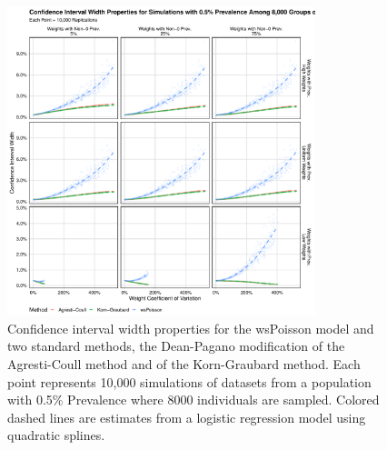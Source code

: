 \documentclass[AMA,STIX1COL]{WileyNJD-v2}
\begin{document}
\begin{figure}
\centering
\includegraphics[width=0.8\textwidth]{figures/perfect_confidence_interval_width_8000_groups_0_005_prev}
\caption{Confidence interval width properties for the wsPoisson model and two standard methods, the Dean-Pagano modification of the Agresti-Coull method and of the Korn-Graubard method.
Each point represents 10,000 simulations of datasets from a population with 0.5\% Prevalence where 8000 individuals are sampled.
Colored dashed lines are estimates from a logistic regression model using quadratic splines.}
\label{fig:perfect_confidence_interval_width_8000_groups_0_005_prev}
\end{figure}
\end{document}
